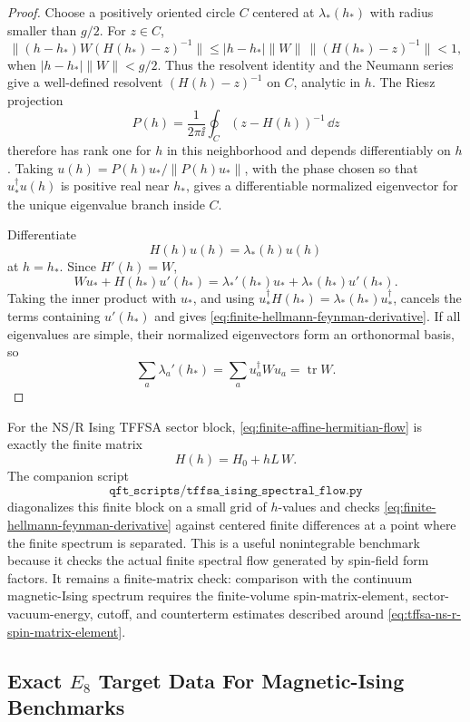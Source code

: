 \begin{proof}
Choose a positively oriented circle \(C\) centered at \(\lambda_*(h_*)\) with
radius smaller than \(g/2\).  For \(z\in C\),
\[
  \|(h-h_*)W(H(h_*)-z)^{-1}\|
  \leq
  |h-h_*|\|W\|\,\|(H(h_*)-z)^{-1}\|
  <
  1 ,
\]
when \(|h-h_*|\|W\|<g/2\).  Thus the resolvent identity and the Neumann series
give a well-defined resolvent \((H(h)-z)^{-1}\) on \(C\), analytic in \(h\).
The Riesz projection
\[
  P(h)=\frac{1}{2\pi\ii}\oint_C (z-H(h))^{-1}\,\dd z
\]
therefore has rank one for \(h\) in this neighborhood and depends
differentiably on \(h\).  Taking \(u(h)=P(h)u_*/\|P(h)u_*\|\), with the phase
chosen so that \(u_*^\dagger u(h)\) is positive real near \(h_*\), gives a
differentiable normalized eigenvector for the unique eigenvalue branch inside
\(C\).

Differentiate
\[
  H(h)u(h)=\lambda_*(h)u(h)
\]
at \(h=h_*\).  Since \(H'(h)=W\),
\[
  Wu_*+H(h_*)u'(h_*)
  =
  \lambda_*'(h_*)u_*+\lambda_*(h_*)u'(h_*) .
\]
Taking the inner product with \(u_*\), and using
\(u_*^\dagger H(h_*)=\lambda_*(h_*)u_*^\dagger\), cancels the terms
containing \(u'(h_*)\) and gives
\eqref{eq:finite-hellmann-feynman-derivative}.  If all eigenvalues are simple,
their normalized eigenvectors form an orthonormal basis, so
\[
  \sum_a\lambda_a'(h_*)
  =
  \sum_a u_a^\dagger W u_a
  =
  \operatorname{tr}W .
\]
\end{proof}

For the NS/R Ising TFFSA sector block,
\eqref{eq:finite-affine-hermitian-flow} is exactly the finite matrix
\[
  H(h)=H_0+hL\,W .
\]
The companion script
\[
  \texttt{qft\_scripts/tffsa\_ising\_spectral\_flow.py}
\]
diagonalizes this finite block on a small grid of \(h\)-values and checks
\eqref{eq:finite-hellmann-feynman-derivative} against centered finite
differences at a point where the finite spectrum is separated.  This is a
useful nonintegrable benchmark because it checks the actual finite spectral
flow generated by spin-field form factors.  It remains a finite-matrix
check: comparison with the continuum magnetic-Ising spectrum requires the
finite-volume spin-matrix-element, sector-vacuum-energy, cutoff, and
counterterm estimates described around
\eqref{eq:tffsa-ns-r-spin-matrix-element}.

\subsection{\texorpdfstring{Exact \(E_8\) Target Data For Magnetic-Ising Benchmarks}{Exact E8 Target Data For Magnetic-Ising Benchmarks}}
\label{subsec:e8-ising-target-data}

